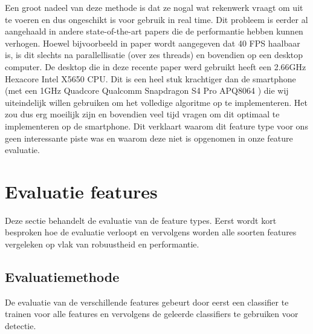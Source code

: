 Een groot nadeel van deze methode is dat ze nogal wat rekenwerk vraagt om uit te voeren en dus ongeschikt is voor gebruik in real time. Dit probleem is eerder al aangehaald in andere state-of-the-art papers die de performantie hebben kunnen verhogen. Hoewel bijvoorbeeld in paper \cite{yan2014fastest} wordt aangegeven dat 40 FPS haalbaar is, is dit slechts na parallellisatie (over zes threads) en bovendien op een desktop computer. De desktop die in deze recente paper werd gebruikt heeft een 2.66GHz Hexacore Intel X5650 CPU. Dit is een heel stuk krachtiger dan de smartphone (met een 1GHz Quadcore Qualcomm Snapdragon S4 Pro APQ8064 ) die wij uiteindelijk willen gebruiken om het volledige algoritme op te implementeren. Het zou dus erg moeilijk zijn en bovendien veel tijd vragen om dit optimaal te implementeren op de smartphone. Dit verklaart waarom dit feature type voor ons geen interessante piste was en waarom deze niet is opgenomen in onze feature evaluatie.

\section{Evaluatie features} \label{sec:feat_eval_res}
Deze sectie behandelt de evaluatie van de feature types. Eerst wordt kort besproken hoe de evaluatie verloopt en vervolgens worden alle soorten features vergeleken op vlak van robuustheid en performantie.

\subsection{Evaluatiemethode} \label{sec:eval_feat}
De evaluatie van de verschillende features gebeurt door eerst een classifier te trainen voor alle features en vervolgens de geleerde classifiers te gebruiken voor detectie. 

